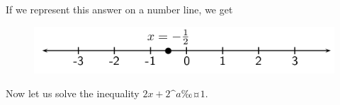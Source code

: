       \label{m39254*id157620}If we represent this answer on a number line, we get\par 
      \label{m39254*id157626}
    \setcounter{subfigure}{0}
	\begin{figure}[H] %
    \begin{center}
    \label{m39254*id157630!!!underscore!!!media}\label{m39254*id157630!!!underscore!!!printimage}\includegraphics[width=.8\columnwidth]{col11306.imgs/m39254_MG10C10_001.png} %
      \vspace{2pt}
    \vspace{.1in}
    \end{center}
 \end{figure}       
      \par 
      \label{m39254*id157636}Now let us solve the inequality $2x+2\^{a}‰¤1$.\par 
      \label{m39254*id157661}\nopagebreak\noindent{}
